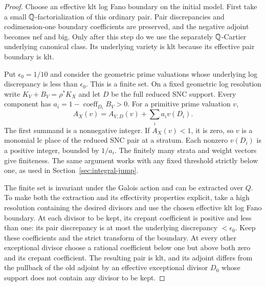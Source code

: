 \begin{proof}
Choose an effective klt log Fano boundary on the initial model.
First take a small $\mathbb Q$-factorialization of this ordinary pair.
Pair discrepancies and codimension-one boundary coefficients are
preserved, and the negative adjoint becomes nef and big.
Only after this step do we use the separately
$\mathbb Q$-Cartier underlying canonical class.  Its underlying variety
is klt because its effective pair boundary is klt.

Put $\epsilon_0=1/10$ and consider the geometric prime valuations
whose underlying log discrepancy is less than $\epsilon_0$.
This is a finite set.  On a fixed geometric log resolution write
$K_V+B_V=\rho^*K_X$ and let $D$ be the full reduced SNC support.
Every component has $a_i=1-\operatorname{coeff}_{D_i}B_V>0$.
For a primitive prime valuation $v$,
\begin{equation}
\label{tower:finite-extraction}
 A_X(v)=A_{V,D}(v)+\sum_i a_i v(D_i).
\end{equation}
The first summand is a nonnegative integer.  If $A_X(v)<1$,
it is zero, so $v$ is a monomial lc place of the reduced SNC
pair at a stratum.  Each nonzero $v(D_i)$ is a positive integer,
bounded by $1/a_i$.  The finitely many strata and weight vectors
give finiteness.  The same argument works with any fixed threshold
strictly below one, as used in Section~\ref{sec:integral-jump}.

The finite set is invariant under the Galois action and can be
extracted over $Q$.  To make both the extraction and its
effectivity properties explicit, take a high resolution containing
the desired divisors and use the chosen effective klt log Fano
boundary.  At each divisor to be kept, its crepant coefficient
is positive and less than one: its pair discrepancy is at most
the underlying discrepancy $<\epsilon_0$.  Keep these coefficients
and the strict transform of the boundary.  At every other
exceptional divisor choose a rational coefficient below one but
above both zero and its crepant coefficient.  The resulting pair
is klt, and its adjoint differs from the pullback of the old
adjoint by an effective exceptional divisor $D_0$ whose support
does not contain any divisor to be kept.


\end{proof}
